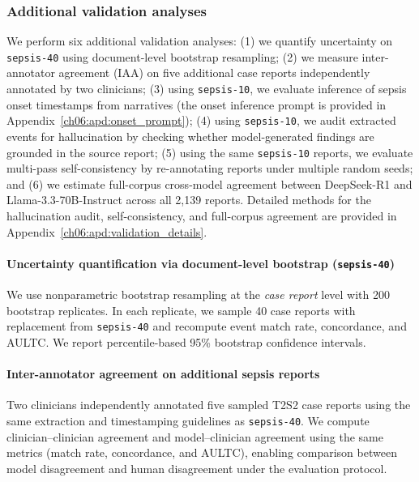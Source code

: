 \subsubsection{Additional validation analyses}
\label{ch06:sec:additional_validation_methods}
We perform six additional validation analyses: (1) we quantify uncertainty on \texttt{sepsis-40} using document-level bootstrap resampling; (2) we measure inter-annotator agreement (IAA) on five additional case reports independently annotated by two clinicians; (3) using \texttt{sepsis-10}, we evaluate inference of sepsis onset timestamps from narratives (the onset inference prompt is provided in Appendix~\ref{ch06:apd:onset_prompt}); (4) using \texttt{sepsis-10}, we audit extracted events for hallucination by checking whether model-generated findings are grounded in the source report; (5) using the same \texttt{sepsis-10} reports, we evaluate multi-pass self-consistency by re-annotating reports under multiple random seeds; and (6) we estimate full-corpus cross-model agreement between DeepSeek-R1 and Llama-3.3-70B-Instruct across all 2,139 reports.
Detailed methods for the hallucination audit, self-consistency, and full-corpus agreement are provided in Appendix~\ref{ch06:apd:validation_details}.

\paragraph{Uncertainty quantification via document-level bootstrap (\texttt{sepsis-40})}
\label{ch06:sec:bootstrap_methods}

We use nonparametric bootstrap resampling at the \emph{case report} level with 200 bootstrap replicates.
In each replicate, we sample 40 case reports with replacement from \texttt{sepsis-40} and recompute event match rate, concordance, and AULTC.
We report percentile-based 95\% bootstrap confidence intervals.

\paragraph{Inter-annotator agreement on additional sepsis reports}
\label{ch06:sec:iaa_methods}
Two clinicians independently annotated five sampled T2S2 case reports using the same extraction and timestamping guidelines as \texttt{sepsis-40}.
We compute clinician--clinician agreement and model--clinician agreement using the same metrics (match rate, concordance, and AULTC), enabling comparison between model disagreement and human disagreement under the evaluation protocol.

